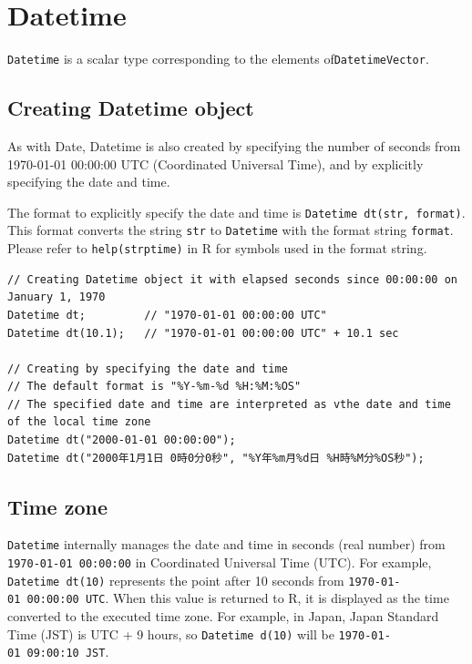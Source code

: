 \documentclass[]{book}
\theoremstyle{definition}
\theoremstyle{definition}
\theoremstyle{remark}
\begin{document}
\chapter{Datetime}\label{datetime}

\texttt{Datetime} is a scalar type corresponding to the elements
of\texttt{DatetimeVector}.

\section{Creating Datetime object}\label{creating-datetime-object}

As with Date, Datetime is also created by specifying the number of
seconds from 1970-01-01 00:00:00 UTC (Coordinated Universal Time), and
by explicitly specifying the date and time.

The format to explicitly specify the date and time is
\texttt{Datetime\ dt(str,\ format)}. This format converts the string
\texttt{str} to \texttt{Datetime} with the format string
\texttt{format}. Please refer to \texttt{help(strptime)} in R for
symbols used in the format string.

\begin{verbatim}
// Creating Datetime object it with elapsed seconds since 00:00:00 on January 1, 1970
Datetime dt;         // "1970-01-01 00:00:00 UTC"
Datetime dt(10.1);   // "1970-01-01 00:00:00 UTC" + 10.1 sec

// Creating by specifying the date and time
// The default format is "%Y-%m-%d %H:%M:%OS"
// The specified date and time are interpreted as vthe date and time of the local time zone
Datetime dt("2000-01-01 00:00:00");
Datetime dt("2000年1月1日 0時0分0秒", "%Y年%m月%d日 %H時%M分%OS秒");
\end{verbatim}

\section{Time zone}\label{time-zone}

\texttt{Datetime} internally manages the date and time in seconds (real
number) from \texttt{1970-01-01\ 00:00:00} in Coordinated Universal Time
(UTC). For example, \texttt{Datetime\ dt(10)} represents the point after
10 seconds from \texttt{1970-01-01\ 00:00:00\ UTC}. When this value is
returned to R, it is displayed as the time converted to the executed
time zone. For example, in Japan, Japan Standard Time (JST) is UTC + 9
hours, so \texttt{Datetime\ d(10)} will be
\texttt{1970-01-01\ 09:00:10\ JST}.
\end{document}
